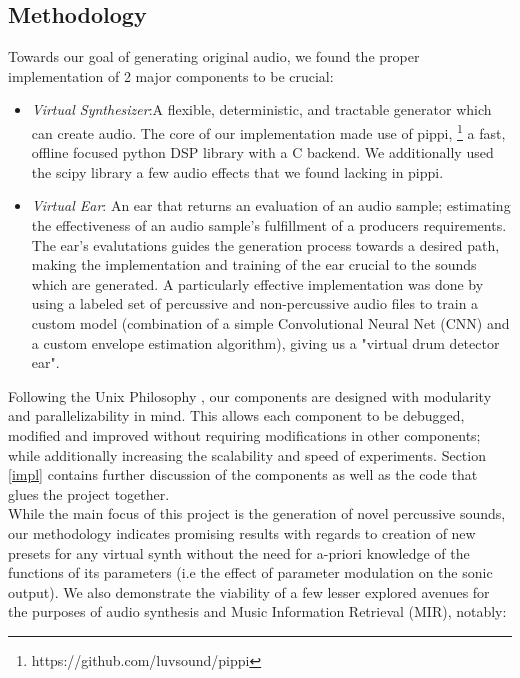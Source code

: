 \documentclass{nime-alternate} %
\begin{document}
\subsection{Methodology}
Towards our goal of generating original audio, we found the proper implementation of 2 major components to be crucial:
\begin{itemize}
    \item \textit{Virtual Synthesizer}:A flexible, deterministic, and tractable generator which can create audio. The core of our implementation made use of pippi, \footnote{https://github.com/luvsound/pippi} a fast, offline focused python DSP library with a C backend. We additionally used the scipy \cite{jones2001scipy} library a few audio effects that we found lacking in pippi. 
    \item \textit{Virtual Ear}: An ear that returns an evaluation of an audio sample; estimating the effectiveness of an audio sample's fulfillment of a producers requirements. The ear's evalutations guides the generation process towards a desired path, making the implementation and training of the ear crucial to the sounds which are generated. A particularly effective implementation was done by using a labeled set of percussive and non-percussive audio files to train a custom model (combination of a simple Convolutional Neural Net (CNN) and a custom envelope estimation algorithm), giving us a "virtual drum detector ear". \\
\end{itemize}
Following the Unix Philosophy \cite{gancarz2003linux}, our components are designed with modularity and parallelizability in mind. This allows each component to be debugged, modified and improved without requiring modifications in other components; while additionally increasing the scalability and speed of experiments.
Section \ref{impl} contains further discussion of the components as well as the code that glues the project together.\\ 
While the main focus of this project is the generation of novel percussive sounds, our methodology indicates promising results with regards to creation of new presets for any virtual synth without the need for a-priori knowledge of the functions of its parameters (i.e the effect of parameter modulation on the sonic output). We also demonstrate the viability of a few lesser explored avenues for the purposes of audio synthesis and Music Information Retrieval (MIR), notably:
\end{document}
